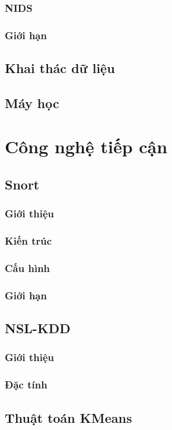 \documentclass{article}
\begin{document}
\begin{flushleft}
        \subsubsection{NIDS}
        \subsubsection{Giới hạn}
        \subsection{Khai thác dữ liệu}
        \subsection{Máy học}
        \newpage
        \section{Công nghệ tiếp cận}
        \subsection{Snort}
        \subsubsection{Giới thiệu}
        \subsubsection{Kiến trúc}
        \subsubsection{Cấu hình}
        \subsubsection{Giới hạn}
        \subsection{NSL-KDD}
        \subsubsection{Giới thiệu}
        \subsubsection{Đặc tính}
        \subsection{Thuật toán KMeans}

\end{flushleft}
\end{document}
